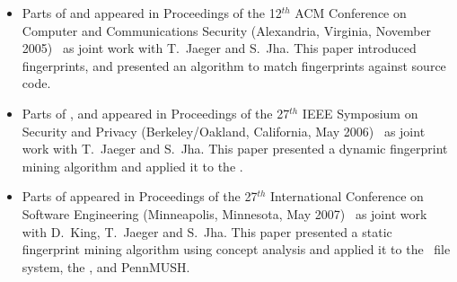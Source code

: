 \begin{itemize}

\item Parts of  and 
appeared in Proceedings of the 12$^{th}$ ACM Conference on Computer and
Communications Security (Alexandria, Virginia, November 2005)~\cite{gjj05} as
joint work with T.~Jaeger and S.~Jha. This paper introduced fingerprints, and
presented an algorithm to match fingerprints against source code.

\item Parts of ,  and
 appeared in Proceedings of the 27$^{th}$ IEEE
Symposium on Security and Privacy (Berkeley/Oakland, California, May
2006)~\cite{gjj06} as joint work with T.~Jaeger and S.~Jha. This paper
presented a dynamic fingerprint mining algorithm and applied it to the
\xserver.

\item Parts of  appeared in Proceedings of the
27$^{th}$ International Conference on Software Engineering (Minneapolis,
Minnesota, May 2007)~\cite{gkj+07} as joint work with D.~King, T.~Jaeger and
S.~Jha. This paper presented a static fingerprint mining algorithm using
concept analysis and applied it to the \ext\ file system, the \xserver, and
PennMUSH.

\end{itemize}

